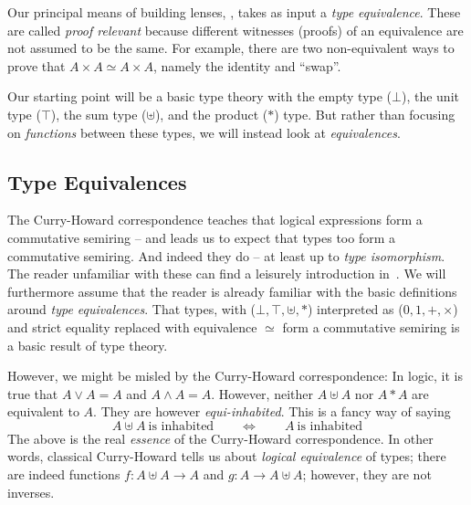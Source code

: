 \documentclass[sigplan,review,anonymous]{acmart}
\newcommand{\presumtype}{\uplus}
\newcommand{\preprodtype}{*}
\begin{document}
Our principal means of building lenses, , takes as
input a \emph{type equivalence}.  These are called \emph{proof relevant}
because different witnesses (proofs) of an equivalence are
not assumed to be the same.  For example, there are two
non-equivalent ways to prove that $A × A \simeq A × A$, namely
the identity and ``swap''.

Our starting point will be a basic type theory with the empty
type ($\bot$), the unit type ($\top$), the sum type ($\presumtype$), and
the product ($\preprodtype$) type. But rather than focusing on
\emph{functions} between these types, we will instead look at
\emph{equivalences}.

\subsection{Type Equivalences}

\noindent The Curry-Howard correspondence teaches that logical
expressions form a commutative semiring -- and leads us to
expect that types
too form a commutative semiring. And indeed they do -- at least up to
\emph{type isomorphism}.  The reader unfamiliar with these can
find a leisurely introduction in~\cite{CaretteJamesSabryArxiv}. We
will furthermore assume that the reader is already familiar with
the basic definitions around \emph{type equivalences}.
That types, with ($\bot, \top, \presumtype,
\preprodtype$) interpreted as ($0, 1, +, ×$) and strict
equality replaced with equivalence $\simeq$
form a commutative semiring is a basic result of type theory.

However, we might be misled by the Curry-Howard correspondence:
In logic, it is true that $A \lor A = A$ and
$A \land A = A$. However, neither $A \presumtype A$ nor $A \preprodtype A$ are
equivalent to $A$. They are however \emph{equi-inhabited}. This is
a fancy way of saying
\[ A \presumtype A \ \text{is inhabited} \qquad \Leftrightarrow \qquad A \
  \text{is inhabited} \] The above is the real \textit{essence} of the
Curry-Howard correspondence.  In other words, classical Curry-Howard
tells us about \emph{logical equivalence} of types; there are indeed functions
$f : A \presumtype A \rightarrow A$ and $g : A \rightarrow A \presumtype A$;
however, they are not inverses.
\end{document}
